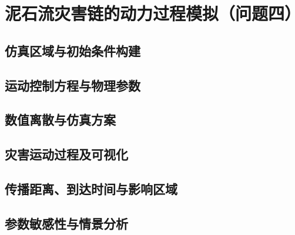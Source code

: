 \section{泥石流灾害链的动力过程模拟（问题四）}\label{sec:simulation}

\subsection{仿真区域与初始条件构建}\label{sec:simulation-domain}
\writingplaceholder

\subsection{运动控制方程与物理参数}\label{sec:governing-equations}
\writingplaceholder

\subsection{数值离散与仿真方案}\label{sec:numerical-scheme}
\writingplaceholder

\subsection{灾害运动过程及可视化}\label{sec:process-visualization}
\writingplaceholder

\subsection{传播距离、到达时间与影响区域}\label{sec:runout-arrival}
\writingplaceholder

\subsection{参数敏感性与情景分析}\label{sec:scenario-analysis}
\writingplaceholder
